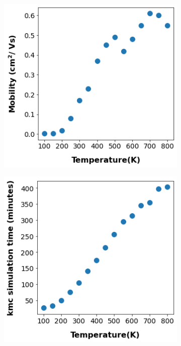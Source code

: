 \begin{figure}[b]
\centering
\begin{subfigure}{.5\textwidth}
    \centering
    \includegraphics[width=\textwidth]{figures/temp.png}
\end{subfigure}%
\begin{subfigure}{.5\textwidth}
    \centering
    \includegraphics[width=\textwidth]{figures/temp_simtime_plot.png}

\end{subfigure}
\end{figure}

